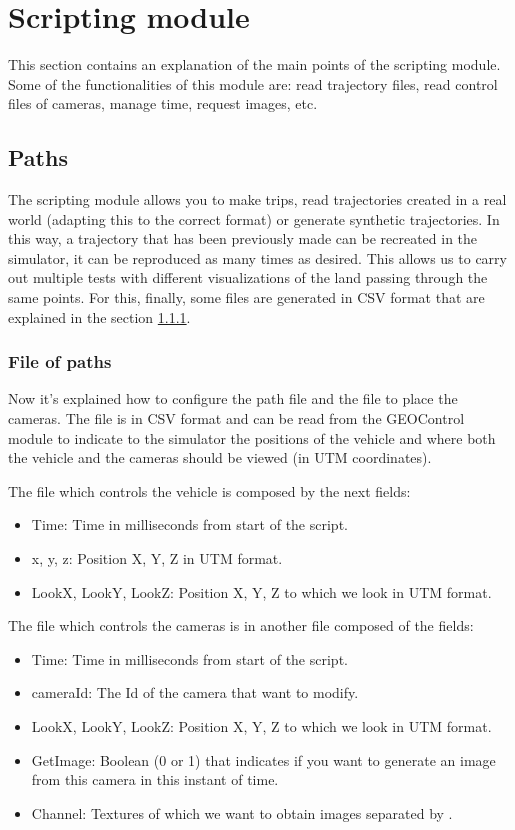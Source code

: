 \documentclass[10pt,a4paper,twocolumn,twoside]{article}
\begin{document}
\section{Scripting module}
\label{modulescript}

This section contains an explanation of the main points of the scripting module. Some of the functionalities of this module are: read trajectory files, read control files of cameras, manage time, request images, etc.

\subsection{Paths}
The scripting module allows you to make trips, read trajectories created in a real world (adapting this to the correct format) or generate synthetic trajectories. In this way, a trajectory that has been previously made can be recreated in the simulator, it can be reproduced as many times as desired. This allows us to carry out multiple tests with different visualizations of the land passing through the same points. For this, finally, some files are generated in CSV format that are explained in the section \ref{file-trajectories}.

\subsubsection{File of paths}
\label{file-trajectories}
Now it's explained how to configure the path file and the file to place the cameras. The file is in CSV format and can be read from the GEOControl module to indicate to the simulator the positions of the vehicle and where both the vehicle and the cameras should be viewed (in UTM coordinates).

The file which controls the vehicle is composed by the next fields:

\begin{itemize}
\setlength\itemsep{0em}
\item Time: Time in milliseconds from start of the script.
\item x, y, z: Position X, Y, Z in UTM format.
\item LookX, LookY, LookZ: Position X, Y, Z to which we look in UTM format.
\end{itemize}

The file which controls the cameras is in another file composed of the fields:

\begin{itemize}
\setlength\itemsep{0em}
\item Time: Time in milliseconds from start of the script.
\item cameraId: The Id of the camera that want to modify.
\item LookX, LookY, LookZ: Position X, Y, Z to which we look in UTM format.
\item GetImage: Boolean (0 or 1) that indicates if you want to generate an image from this camera in this instant of time.
\item Channel: Textures of which we want to obtain images separated by \textbar.
\end{itemize}
\end{document}
